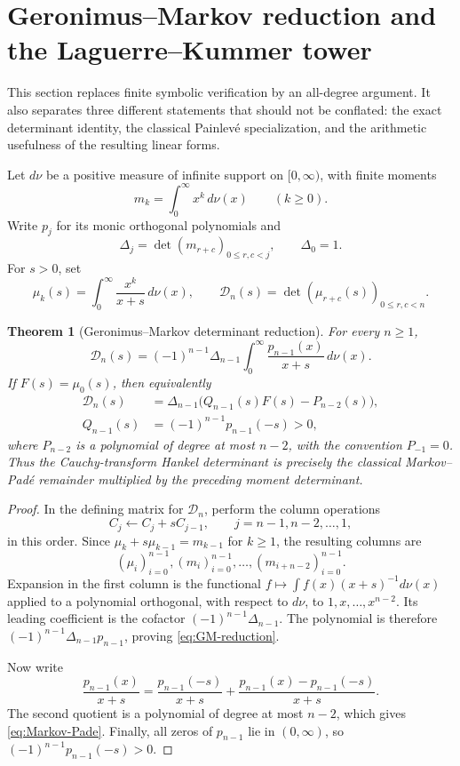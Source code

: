 \documentclass[11pt]{article}
\newtheorem{theorem}{Theorem}[section]
\theoremstyle{definition}
\theoremstyle{remark}
\begin{document}
\section{Geronimus--Markov reduction and the Laguerre--Kummer tower}
\label{sec:geronimus-kummer}

This section replaces finite symbolic verification by an all-degree argument.
It also separates three different statements that should not be conflated:
the exact determinant identity, the classical Painlev\'e specialization, and
the arithmetic usefulness of the resulting linear forms.

Let \(d\nu\) be a positive measure of infinite support on
\([0,\infty)\), with finite moments
\[
  m_k=\int_0^\infty x^k\,d\nu(x) \qquad(k\geq 0).
\]
Write \(p_j\) for its monic orthogonal polynomials and
\[
  \Delta_j=\det(m_{r+c})_{0\leq r,c<j},\qquad \Delta_0=1.
\]
For \(s>0\), set
\[
  \mu_k(s)=\int_0^\infty\frac{x^k}{x+s}\,d\nu(x),
  \qquad
  \mathcal D_n(s)=\det(\mu_{r+c}(s))_{0\leq r,c<n}.
\]

\begin{theorem}[Geronimus--Markov determinant reduction]
\label{thm:GM-reduction}
For every \(n\geq1\),
\begin{equation}
 \boxed{
 \mathcal D_n(s)=(-1)^{n-1}\Delta_{n-1}
 \int_0^\infty\frac{p_{n-1}(x)}{x+s}\,d\nu(x).}
 \label{eq:GM-reduction}
\end{equation}
If \(F(s)=\mu_0(s)\), then equivalently
\begin{equation}
 \begin{aligned}
 \mathcal D_n(s)
   &=\Delta_{n-1}\bigl(Q_{n-1}(s)F(s)-P_{n-2}(s)\bigr),\\
 Q_{n-1}(s)&=(-1)^{n-1}p_{n-1}(-s)>0,
 \end{aligned}
 \label{eq:Markov-Pade}
\end{equation}
where \(P_{n-2}\) is a polynomial of degree at most \(n-2\), with the
convention \(P_{-1}=0\).
Thus the Cauchy-transform Hankel determinant is precisely the classical
Markov--Pad\'e remainder multiplied by the preceding moment determinant.
\end{theorem}

\begin{proof}
In the defining matrix for \(\mathcal D_n\), perform the column operations
\[
 C_j\longleftarrow C_j+sC_{j-1},
 \qquad j=n-1,n-2,\ldots,1,
\]
in this order.  Since
\(\mu_k+s\mu_{k-1}=m_{k-1}\) for \(k\geq1\), the resulting columns are
\[
  (\mu_i)_{i=0}^{n-1},
  (m_i)_{i=0}^{n-1},
  \ldots,
  (m_{i+n-2})_{i=0}^{n-1}.
\]
Expansion in the first column is the functional
\(f\mapsto\int f(x)(x+s)^{-1}d\nu(x)\) applied to a polynomial orthogonal,
with respect to \(d\nu\), to \(1,x,\ldots,x^{n-2}\).  Its leading coefficient
is the cofactor \((-1)^{n-1}\Delta_{n-1}\).  The polynomial is therefore
\((-1)^{n-1}\Delta_{n-1}p_{n-1}\), proving
\eqref{eq:GM-reduction}.

Now write
\[
 \frac{p_{n-1}(x)}{x+s}
 =\frac{p_{n-1}(-s)}{x+s}
  +\frac{p_{n-1}(x)-p_{n-1}(-s)}{x+s}.
\]
The second quotient is a polynomial of degree at most \(n-2\), which gives
\eqref{eq:Markov-Pade}.  Finally, all zeros of \(p_{n-1}\) lie in
\((0,\infty)\), so \((-1)^{n-1}p_{n-1}(-s)>0\).
\end{proof}
\end{document}
